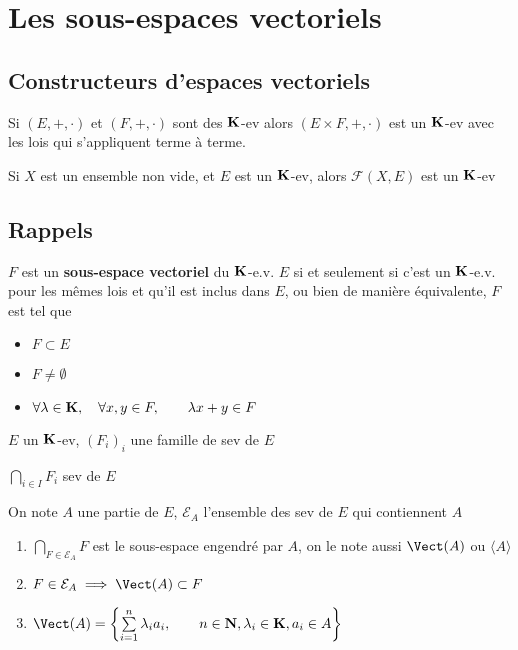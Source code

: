 
    \section{Les sous-espaces vectoriels}

    \subsection{Constructeurs d'espaces vectoriels}

    Si $(E, +, \cdot)$ et  $(F, +, \cdot)$ sont des  $\mathbf K$-ev alors $(E\times F, +, \cdot)$ est un  $\mathbf K$-ev avec les lois qui s'appliquent terme à terme.

    Si $X$ est un ensemble non vide, et $E$ est un  $\mathbf K$-ev, alors $\mathcal F(X,E)$ est un  $\mathbf K$-ev

    \subsection{Rappels}

    \begin{dfn}
        $F$ est un \textbf{sous-espace vectoriel}  du  $\mathbf K$-e.v. $E$  si et seulement si c'est un $\mathbf K$-e.v. pour les mêmes lois et qu'il est inclus dans $E$, ou bien de manière équivalente, $F$ est tel que  \begin{itemize}
            \item $F\subset E$
            \item  $F\neq \emptyset$
            \item  $ \forall  \lambda \in  \mathbf K, \quad  \forall  x, y \in  F, \qquad  \lambda x+y \in  F$
        \end{itemize}
    \end{dfn}

    \begin{defprop}
        \Hyp $E$ un $\mathbf K$-ev, $(F_i)_i$ une famille de sev de  $E$
        \begin{concenum}
        \item $\bigcap_{i \in I }\limits F_i $ sev de $E$
        \item On note $A$ une partie de  $E$, $\mathcal  E_A$ l'ensemble des sev de $E$ qui contiennent  $A$ \begin{enumerate}
            \item $\bigcap_{F \in  \mathcal  E_A}\limits F$ est le sous-espace engendré par $A$, on le note aussi  $\Vect(A)$ ou  $\langle A\rangle$
            \item  $F \in  \mathcal  E_A \implies  \Vect(A)\subset F$
            \item $\Vect(A)= \left\{ \sum_{i=1}^n\limits \lambda_ia_i,\qquad  n \in  \N, \lambda_i \in  \K,a_i \in  A \right\}$
        \end{enumerate}
    \end{concenum}
\end{defprop}

